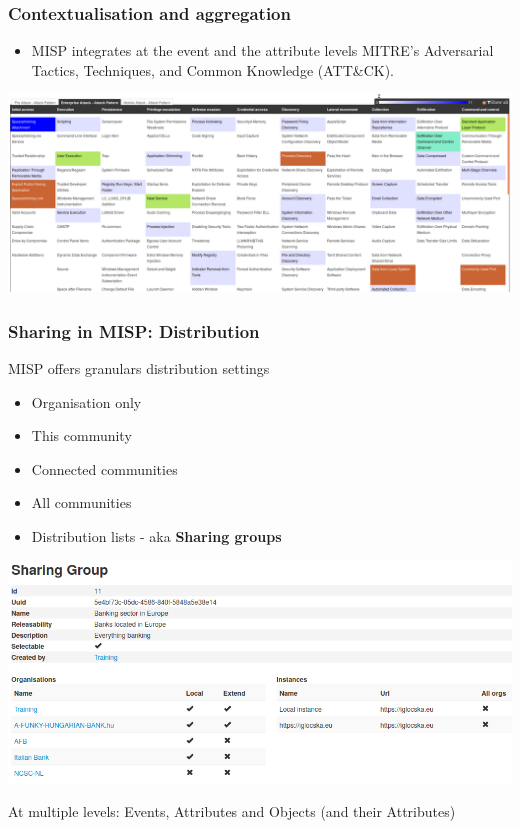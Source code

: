 \begin{frame}
        \frametitle{Contextualisation and aggregation}
        \begin{itemize}
                \item MISP integrates at the event and the attribute levels MITRE's Adversarial Tactics, Techniques, and Common Knowledge (ATT\&CK).
        \end{itemize}
        \includegraphics[scale=0.2]{screenshots/attack-screenshot.png}
\end{frame}

\begin{frame}
\frametitle{Sharing in MISP: Distribution}
    MISP offers granulars distribution settings
    \begin{itemize}
        \item Organisation only
        \item This community
        \item Connected communities
        \item All communities
        \item Distribution lists - aka {\bf Sharing groups}
    \end{itemize}
    \begin{center}
    \includegraphics[scale=0.2]{screenshots/sg-example.png}
    \end{center}

    At multiple levels: Events, Attributes and Objects (and their Attributes)
\end{frame}

